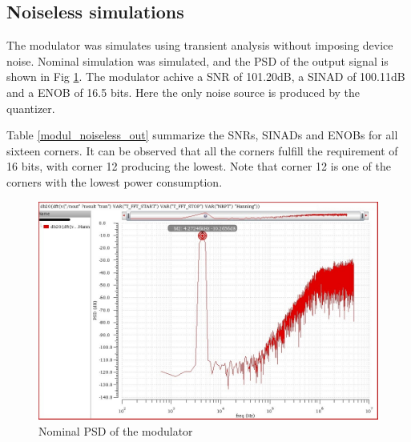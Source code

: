 \subsection{Noiseless simulations}
The modulator was simulates using transient analysis without imposing device noise. Nominal simulation was simulated, and the PSD of the output signal is shown in Fig \ref{psd_out}. The modulator achive a SNR of 101.20dB, a SINAD of 100.11dB and a ENOB of 16.5 bits. Here the only noise source is produced by the quantizer. 

Table \ref{modul_noiseless_out} summarize the SNRs, SINADs and ENOBs for all sixteen corners. It can be observed that all the corners fulfill the requirement of 16 bits, with corner 12 producing the lowest. Note that corner 12 is one of the corners with the lowest power consumption. 

\begin{figure}[H]
\centering
\includegraphics[width=\textwidth]{images/psd_out.jpg}
\caption{Nominal PSD of the modulator }
\label{psd_out}
\end{figure}

